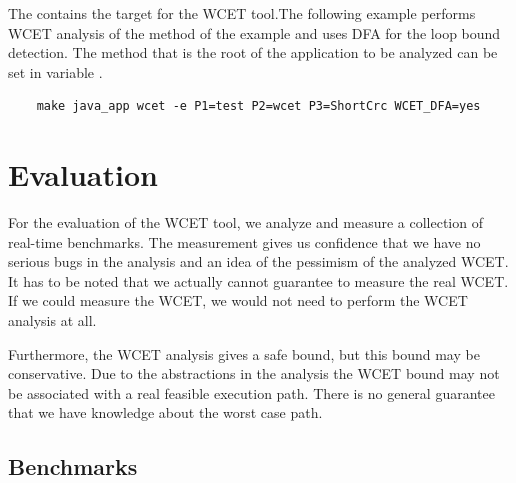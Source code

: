 The  contains the target  for the WCET
tool.The following example performs WCET analysis of the method
 of the  example and uses DFA for the loop
bound detection. The method that is the root of the application to be
analyzed can be set in variable .
\begin{lstlisting}
    make java_app wcet -e P1=test P2=wcet P3=ShortCrc WCET_DFA=yes
\end{lstlisting}

\section{Evaluation}
\label{sec:wcet:eval}

For the evaluation of the WCET tool, we analyze and measure a
collection of real-time benchmarks. The measurement gives us
confidence that we have no serious bugs in the analysis and an idea
of the pessimism of the analyzed WCET. It has to be noted that we
actually cannot guarantee to measure the real WCET. If we could
measure the WCET, we would not need to perform the WCET analysis at
all.

Furthermore, the WCET analysis gives a safe bound, but this bound may
be conservative. Due to the abstractions in the analysis the WCET
bound may not be associated with a real feasible execution path.
There is no general guarantee that we have knowledge about the worst
case path.


\subsection{Benchmarks}
\label{sec:benchmarks}

